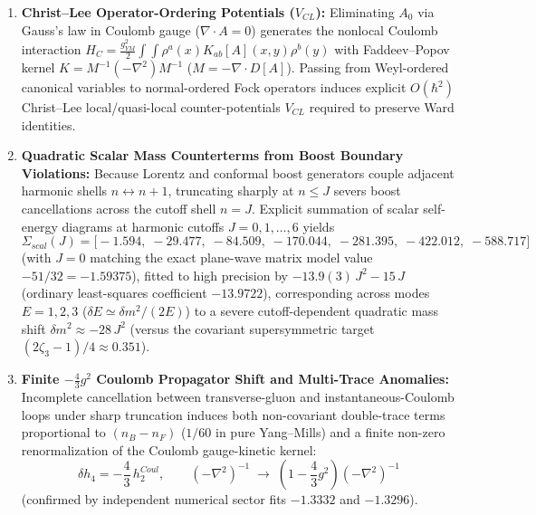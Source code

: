\documentclass[american,11pt,letterpaper]{article}
\def\mathbf#1{#1}%
\def\mathrm#1{#1}%
\begin{document}
\begin{enumerate}[leftmargin=2em]
  \item \textbf{Christ--Lee Operator-Ordering Potentials ($V_{\mathrm{CL}}$):} Eliminating $A_0$ via Gauss's law in Coulomb gauge ($\nabla\cdot\mathbf{A} = 0$) generates the nonlocal Coulomb interaction $H_{\mathrm{C}} = \frac{g_{\mathrm{YM}}^2}{2}\int\!\!\int \rho^a(x) K_{ab}[\mathbf{A}](x,y)\rho^b(y)$ with Faddeev--Popov kernel $K = M^{-1}(-\nabla^2)M^{-1}$ ($M = -\nabla\cdot\mathbf{D}[\mathbf{A}]$). Passing from Weyl-ordered canonical variables to normal-ordered Fock operators induces explicit $O(\hbar^2)$ Christ--Lee local/quasi-local counter-potentials $V_{\mathrm{CL}}$ required to preserve Ward identities.
  \item \textbf{Quadratic Scalar Mass Counterterms from Boost Boundary Violations:} Because Lorentz and conformal boost generators couple adjacent harmonic shells $n \leftrightarrow n+1$, truncating sharply at $n \le J$ severs boost cancellations across the cutoff shell $n = J$. Explicit summation of scalar self-energy diagrams at harmonic cutoffs $J = 0, 1, \dots, 6$ yields
  \[
  \Sigma_{\mathrm{scal}}(J) = \bigl[-1.594,\;-29.477,\;-84.509,\;-170.044,\;-281.395,\;-422.012,\;-588.717\bigr]
  \]
  (with $J=0$ matching the exact plane-wave matrix model value $-51/32 = -1.59375$), fitted to high precision by $-13.9(3)\,J^2 - 15\,J$ (ordinary least-squares coefficient $-13.9722$), corresponding across modes $E = 1, 2, 3$ ($\delta E \simeq \delta m^2/(2E)$) to a severe cutoff-dependent quadratic mass shift $\delta m^2 \approx -28\,J^2$ (versus the covariant supersymmetric target $(2\zeta_3 - 1)/4 \approx 0.351$).
  \item \textbf{Finite $-\frac{4}{3}g^2$ Coulomb Propagator Shift and Multi-Trace Anomalies:} Incomplete cancellation between transverse-gluon and instantaneous-Coulomb loops under sharp truncation induces both non-covariant double-trace terms proportional to $(n_B - n_F)$ ($1/60$ in pure Yang--Mills) and a finite non-zero renormalization of the Coulomb gauge-kinetic kernel:
  \begin{equation}
  \delta h_4 = -\frac{4}{3}\,h_2^{\mathrm{Coul}},
  \qquad
  (-\nabla^2)^{-1} \;\longrightarrow\; \left(1 - \frac{4}{3}g^2\right)(-\nabla^2)^{-1}
  \label{eq:coulomb_4_3_anomaly}
  \end{equation}
  (confirmed by independent numerical sector fits $-1.3332$ and $-1.3296$).
\end{enumerate}
\end{document}
